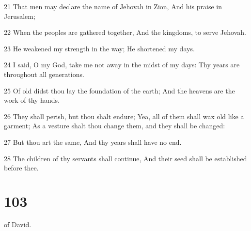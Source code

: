 \par 21 That men may declare the name of Jehovah in Zion, And his praise in Jerusalem;
\par 22 When the peoples are gathered together, And the kingdoms, to serve Jehovah.
\par 23 He weakened my strength in the way; He shortened my days.
\par 24 I said, O my God, take me not away in the midst of my days: Thy years are throughout all generations.
\par 25 Of old didst thou lay the foundation of the earth; And the heavens are the work of thy hands.
\par 26 They shall perish, but thou shalt endure; Yea, all of them shall wax old like a garment; As a vesture shalt thou change them, and they shall be changed:
\par 27 But thou art the same, And thy years shall have no end.
\par 28 The children of thy servants shall continue, And their seed shall be established before thee.

\chapter{103}

\par [A Psalm] of David.

